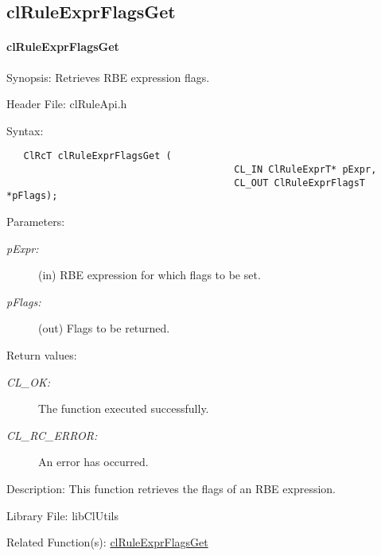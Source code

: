\begin{flushleft}
\subsection{clRuleExprFlagsGet}
\hypertarget{pagerule113}{}\paragraph{cl\-Rule\-Expr\-Flags\-Get}\label{pagerule113}
\begin{Desc}
\item[Synopsis:]Retrieves RBE expression flags.\end{Desc}
\begin{Desc}
\item[Header File:]clRuleApi.h\end{Desc}
\begin{Desc}
\item[Syntax:]

\footnotesize\begin{verbatim}   ClRcT clRuleExprFlagsGet (
                              			CL_IN ClRuleExprT* pExpr,
                              			CL_OUT ClRuleExprFlagsT *pFlags);
\end{verbatim}
\normalsize
\end{Desc}
\begin{Desc}
\item[Parameters:]
\begin{description}
\item[{\em p\-Expr:}](in) RBE expression for which flags to be set. \item[{\em p\-Flags:}](out) Flags to be returned.\end{description}
\end{Desc}
\begin{Desc}
\item[Return values:]
\begin{description}
\item[{\em CL\_\-OK:}]The function executed successfully. \item[{\em CL\_\-RC\_\-ERROR:}]An error has occurred.\end{description}
\end{Desc}
\begin{Desc}
\item[Description:]This function retrieves the flags of an RBE expression.\end{Desc}
\begin{Desc}
\item[Library File:]lib\-Cl\-Utils\end{Desc}
\begin{Desc}
\item[Related Function(s):]\hyperlink{pagerule113}{cl\-Rule\-Expr\-Flags\-Get} \end{Desc}
\newpage


\end{flushleft}
